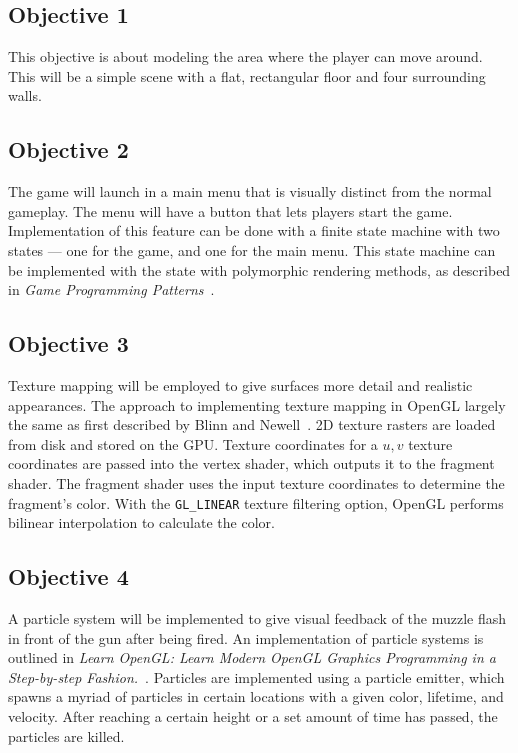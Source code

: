 \documentclass {article}
\begin{document}
\subsection{Objective 1}
This objective is about modeling the area where the player can move around. This will be a simple scene with a flat, rectangular floor and four surrounding walls.

\subsection{Objective 2}
The game will launch in a main menu that is visually distinct from the normal gameplay. The menu will have a button that lets players start the game. Implementation of this feature can be done with a finite state machine with two states --- one for the game, and one for the main menu. This state machine can be implemented with the state with polymorphic rendering methods, as described in \textit{Game Programming Patterns}~\cite{state}.

\subsection{Objective 3}
Texture mapping will be employed to give surfaces more detail and realistic appearances. The approach to implementing texture mapping in OpenGL largely the same as first described by Blinn and Newell~\cite{texture}. 2D texture rasters are loaded from disk and stored on the GPU. Texture coordinates for a  $u, v$ texture coordinates are passed into the vertex shader, which outputs it to the fragment shader. The fragment shader uses the input texture coordinates to determine the fragment's color. With the \texttt{GL\_LINEAR} texture filtering option, OpenGL performs bilinear interpolation to calculate the color.


\subsection{Objective 4}
A particle system will be implemented to give visual feedback of the muzzle flash in front of the gun after being fired. An implementation of particle systems is outlined in \textit{Learn OpenGL: Learn Modern OpenGL Graphics Programming in a Step-by-step Fashion.}~\cite{learnopengl}. Particles are implemented using a particle emitter, which spawns a myriad of particles in certain locations with a given color, lifetime, and velocity. After reaching a certain height or a set amount of time has passed, the particles are killed.
\end{document}
